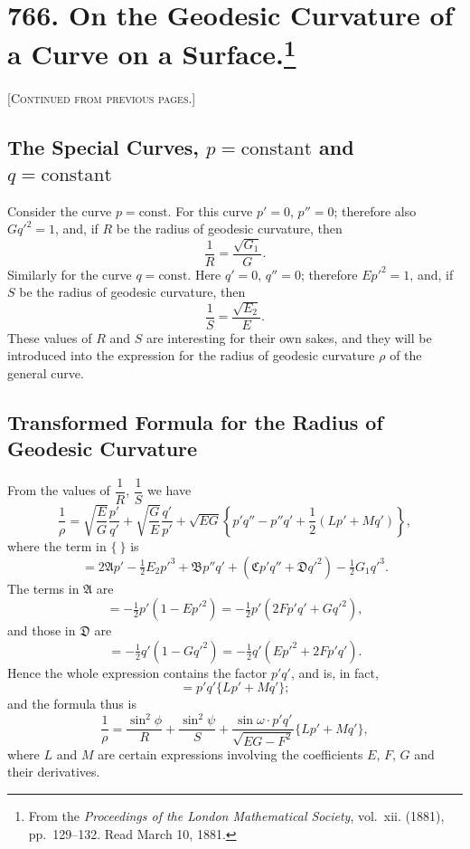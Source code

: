\documentclass[11pt,a4paper]{book}
\begin{document}
\thispagestyle{empty}


\newpage

\section[On the Geodesic Curvature of a Curve on a Surface]{766. On the Geodesic Curvature of a Curve on a Surface.\footnote{From the \textit{Proceedings of the London Mathematical Society}, vol.~xii. (1881), pp.~129--132. Read March 10, 1881.}}

\noindent\textsc{[Continued from previous pages.]}

\subsection*{The Special Curves, $p = \text{constant}$ and $q = \text{constant}$}

Consider the curve $p = \text{const}$. For this curve $p' = 0$, $p'' = 0$; therefore also $Gq'^2 = 1$, and, if $R$ be the radius of geodesic curvature, then
\[
\frac{1}{R} = \frac{\sqrt{G_1}}{G}.
\]
Similarly for the curve $q = \text{const}$. Here $q' = 0$, $q'' = 0$; therefore $Ep'^2 = 1$, and, if $S$ be the radius of geodesic curvature, then
\[
\frac{1}{S} = \frac{\sqrt{E_2}}{E}.
\]
These values of $R$ and $S$ are interesting for their own sakes, and they will be introduced into the expression for the radius of geodesic curvature $\rho$ of the general curve.

\subsection*{Transformed Formula for the Radius of Geodesic Curvature}

From the values of $\dfrac{1}{R}$, $\dfrac{1}{S}$ we have
\[
\frac{1}{\rho} = \sqrt{\frac{E}{G}} \frac{p'}{q'} + \sqrt{\frac{G}{E}} \frac{q'}{p'} + \sqrt{EG} \left\{ p'q'' - p''q' + \frac{1}{2}(Lp' + Mq') \right\},
\]
where the term in $\{\ \}$ is
\[
= 2\mathfrak{A}p' - \tfrac{1}{2}E_2 p'^3 + \mathfrak{B}p''q' + (\mathfrak{C}p'q'' + \mathfrak{D}q'^2) - \tfrac{1}{2}G_1 q'^3.
\]
The terms in $\mathfrak{A}$ are
\[
= -\tfrac{1}{2}p'(1 - Ep'^2) = -\tfrac{1}{2}p'(2Fp'q' + Gq'^2),
\]
and those in $\mathfrak{D}$ are
\[
= -\tfrac{1}{2}q'(1 - Gq'^2) = -\tfrac{1}{2}q'(Ep'^2 + 2Fp'q').
\]
Hence the whole expression contains the factor $p'q'$, and is, in fact,
\[
= p'q'\{Lp' + Mq'\};
\]
and the formula thus is
\[
\frac{1}{\rho} = \frac{\sin^2\phi}{R} + \frac{\sin^2\psi}{S} + \frac{\sin\omega \cdot p'q'}{\sqrt{EG - F^2}}\{Lp' + Mq'\},
\]
where $L$ and $M$ are certain expressions involving the coefficients $E$, $F$, $G$ and their derivatives.
\end{document}
